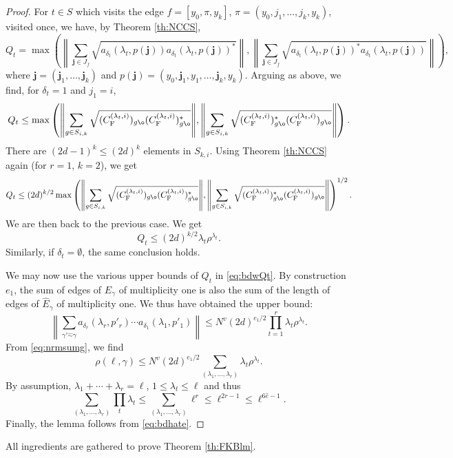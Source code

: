 \documentclass[11pt]{article}
\renewcommand{\star}{{\mathrm{F}}}
\newcommand{\NRM}[1]{{{\left\| #1\right\|}}} %
\newcommand{\1}{1\!\!{\sf I}}
\begin{document}
\begin{proof}
 For $t \in S$ which visits the edge $f = [y_0,\pi,y_k]$, $\pi = (y_0,j_1,\ldots,j_k,y_k)$, visited once, we have, by Theorem \ref{th:NCCS}, 
$$
Q_t = \max \left( \NRM{ \sum_{\bm{j} \in J_f}  \sqrt{ a_{\delta_t} (\lambda_t , p(\bm j)) a_{\delta_t} (\lambda_t , p(\bm j))^*}}, \NRM{\sum_{\bm j \in J_f} \sqrt{a_{\delta_t} (\lambda_t , p(\bm j))^* a_{\delta_t} (\lambda_t , p(\bm j))}} \right),
$$
where $\bm j = (\bm j_1, \ldots, \bm j_k)$ and $p(\bm j) = (y_0,\bm j_1, y_1,\ldots, \bm j_k,y_k)$. Arguing as above, we find, for  $\delta_t = 1$ and $j_1 = i$, 
$$
Q_t \leq \max \left( \NRM{ \sum_{ g  \in S_{i,k} } \sqrt{   (C^{(\lambda_t,i)}_\star) _{ g \o }     (C^{(\lambda_t,i)}_\star)^* _{ g \o }  }} ,  \NRM{ \sum_{ g  \in S_{i,k} }   \sqrt{(C^{(\lambda_t,i)}_\star)^* _{ g \o }    (C^{(\lambda_t,i)}_\star) _{ g \o }  } } \right).
$$
There are $(2d-1)^{k} \leq (2d)^{k}$ elements in $S_{k,i}$. Using Theorem \ref{th:NCCS} again (for $r = 1$, $k = 2$), we get 
$$
Q_t \leq (2d)^{k/2}\max \left( \NRM{ \sum_{ g  \in S_{i,k} } \sqrt{   (C^{(\lambda_t,i)}_\star) _{ g \o }     (C^{(\lambda_t,i)}_\star)^* _{ g \o }  }} ,  \NRM{ \sum_{ g  \in S_{i,k} }   \sqrt{(C^{(\lambda_t,i)}_\star)^* _{ g \o }    (C^{(\lambda_t,i)}_\star) _{ g \o }  } } \right)^{1/2}.
$$
We are then back to the previous case. We get 
$$
Q_t \leq (2d)^{k/2} \lambda_t \rho^{\lambda_t}.
$$
Similarly, if $\delta_t = \emptyset$, the same conclusion holds. 

We may now use the various upper bounds of $Q_t$ in \eqref{eq:bdwQt}.  By construction $e_1$, the sum of edges of $E_\gamma$ of multiplicity one is also the sum of the length of edges of $\widehat E_\gamma$ of multiplicity one. We thus have obtained the upper bound:
$$
 \NRM{ \sum_{\gamma' \hat \sim \gamma}   a_{\delta_r}(\lambda_r,p'_r)  \cdots  a_{\delta_1}(\lambda_1,p'_1) } \leq N^v (2d)^{e_1/2} \prod_{t=1}^r \lambda_t \rho^{\lambda_t}.
$$
From \eqref{eq:nrmsumg}, we find
$$
\rho(\ell,\gamma) \leq N^v (2d)^{e_1/2} \sum_{(\lambda_1, \ldots ,\lambda_r) } \lambda_t \rho^{\lambda_t}.
$$
By assumption, $\lambda_1+ \cdots + \lambda_r = \ell$, $1 \leq \lambda_t \leq \ell$ and thus 
$$
\sum_{(\lambda_1, \ldots ,\lambda_r)} \prod_t \lambda_t \leq  \sum_{(\lambda_1, \ldots ,\lambda_r)} \ell^{r} \leq \ell^{2r-1} \leq \ell^{6 \hat e-1}.
$$
Finally, the lemma follows from \eqref{eq:bdhate}. \end{proof}


All ingredients are gathered to prove Theorem \ref{th:FKBlm}. 
\end{document}
